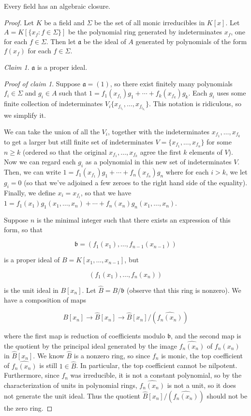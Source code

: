\begin{theorem}
Every field has an algebraic closure.
\end{theorem}

\begin{proof}
Let $ K$ be a field and $ \Sigma$ be the set of all monic irreducibles in $ K[x]$. Let $ A = K[\{x_f : f \in \Sigma\}]$ be the polynomial ring generated by indeterminates $ x_f$, one for each $ f \in \Sigma$. Then let $ \mathfrak{a}$ be the ideal of $ A$ generated by polynomials of the form $ f(x_f)$ for each $ f \in \Sigma$.

\emph{Claim 1}. $ \mathfrak{a}$ is a proper ideal.

\emph{Proof of claim 1}. Suppose $ \mathfrak{a} = (1)$, so there exist finitely many polynomials $ f_i \in \Sigma$ and $ g_i \in A$ such that $ 1 = f_1(x_{f_1}) g_1 + \dotsb + f_k(x_{f_k}) g_k$. Each $ g_i$ uses some finite collection of indeterminates $ V_i \{x_{f_{i_1}}, \dotsc, x_{f_{i_{k_i}}}\}$. This notation is ridiculous, so we simplify it.

We can take the union of all the $ V_i$, together with the indeterminates $ x_{f_1}, \dotsc, x_{f_k}$ to get a larger but still finite set of indeterminates $ V = \{x_{f_1}, \dotsc, x_{f_n}\}$ for some $ n \geq k$ (ordered so that the original $ x_{f_1}, \dotsc, x_{f_k}$ agree the first $ k$ elements of $ V$). Now we can regard each $ g_i$ as a polynomial in this new set of indeterminates $ V$.
Then, we can write $ 1 = f_1(x_{f_1}) g_1 + \dotsb + f_n(x_{f_n}) g_n$ where for each $ i > k$, we let $ g_i = 0$ (so that we've adjoined a few zeroes to the right hand side of the equality).
Finally, we define $ x_i = x_{f_i}$, so that we have
$ 1 = f_1(x_1)g_1(x_1, \dotsc, x_n) + \dotsb + f_n(x_n) g_n(x_1, \dotsc, x_n)$.

Suppose $ n$ is the minimal integer such that there exists an expression of this form, so that

\[ \mathfrak{b} = (f_1(x_1), \dotsc, f_{n-1}(x_{n-1})) \]

is a proper ideal of $ B = K[x_1, \dotsc, x_{n-1}]$, but

\[ (f_1(x_1), \dotsc, f_n(x_n)) \]

is the unit ideal in $ B[x_n]$. Let $ \hat{B} = B/\mathfrak{b}$ (observe that this ring is nonzero). We have a composition of maps

\[ B[x_n] \to \hat{B}[x_n] \to \hat{B}[x_n]/(\widehat{f_n(x_n)}) \]

where the first map is reduction of coefficients modulo $ \mathfrak{b}$, and the second map is the quotient by the principal ideal generated by the image $ \widehat{f_n(x_n)}$ of $ f_n(x_n)$ in $ \hat{B}[x_n]$. We know $ \hat{B}$ is a nonzero ring, so since $ f_n$ is monic, the top coefficient of $ \widehat{f_n(x_n)}$ is still $ 1 \in \hat{B}$. In particular, the top coefficient cannot be nilpotent. Furthermore, since $ f_n$ was irreducible, it is not a constant polynomial, so by the characterization of units in polynomial rings, $ \widehat{f_n(x_n)}$ is not a unit, so it does not generate the unit ideal. Thus the quotient $ \hat{B}[x_n]/(\widehat{f_n(x_n)})$ should not be the zero ring.


\end{proof}
